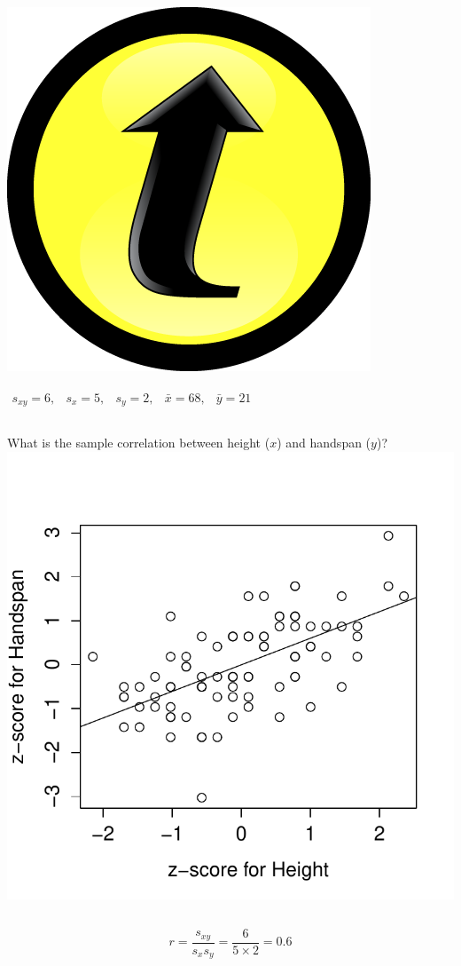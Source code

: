 \documentclass[handout]{beamer}
\begin{document}
\begin{frame}
\frametitle{\includegraphics[scale = 0.05]{./images/clicker}}
$\begin{array}{ccccc} s_{xy} = 6,&s_x = 5,& s_y = 2,& \bar{x} = 68,& \bar{y} = 21\end{array}$
\begin{columns}[c]
\column{2.5in}
What is the sample correlation between height ($x$) and handspan ($y$)?
\column{1.8in}
\includegraphics[scale = 0.4]{./images/height_handspan_zline}
\end{columns}
\alert{$$r = \frac{s_{xy}}{s_x s_y} = \frac{6}{5\times 2} = 0.6$$}
\end{frame}
\end{document}
